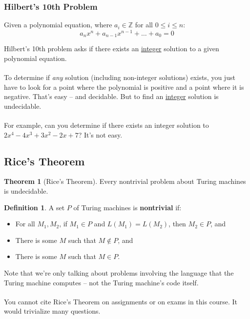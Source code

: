 \documentclass[]{article}
\theoremstyle{definition}
\newtheorem*{defn}{Definition}
\newtheorem*{theorem}{Theorem}
\begin{document}
      \subsubsection{Hilbert's 10th Problem}
        Given a polynomial equation, where $a_i \in \mathbb{Z}$ for all $0 \le i \le n$:
        $$
          a_n x^n + a_{n - 1} x^{n - 1} + \ldots + a_0 = 0
        $$

        Hilbert's 10th problem asks if there exists an \underline{integer} solution to a given polynomial equation.
        \\ \\
        To determine if \emph{any} solution (including non-integer solutions) exists, you just have to look for a point where the polynomial is positive and a point where it is negative. That's easy -- and decidable. But to find an \underline{integer} solution is undecidable.
        \\ \\
        For example, can you determine if there exists an integer solution to $2x^4 - 4x^3 + 3x^2 - 2x + 7$? It's not easy.

    \subsection{Rice's Theorem}
      \begin{theorem}[Rice's Theorem]
        Every nontrivial problem about Turing machines is undecidable.
      \end{theorem}

      \begin{defn}
        A set $P$ of Turing machines is \textbf{nontrivial} if:
        \begin{itemize}
          \item For all $M_1, M_2$, if $M_1 \in P$ and $L(M_1) = L(M_2)$, then $M_2 \in P$, and
          \item There is some $M$ such that $M \not \in P$, and
          \item There is some $M$ such that $M \in P$.
        \end{itemize}
      \end{defn}

      Note that we're only talking about problems involving the language that the Turing machine computes -- not the Turing machine's code itself.
      \\ \\
      You cannot cite Rice's Theorem on assignments or on exams in this course. It would trivialize many questions.
\end{document}

